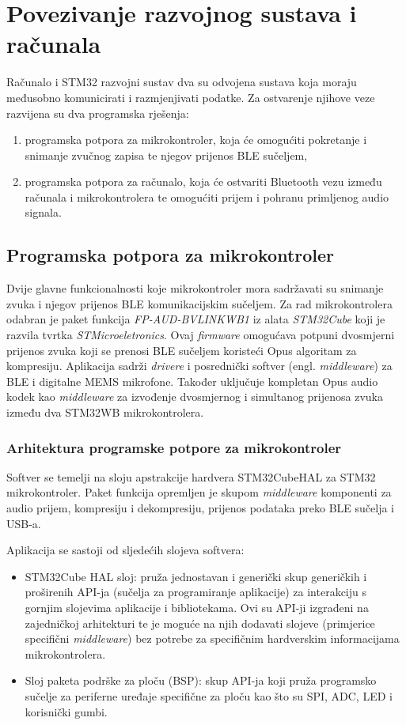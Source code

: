 \chapter{Povezivanje razvojnog sustava i računala}

Računalo i STM32 razvojni sustav dva su odvojena sustava koja moraju međusobno komunicirati i razmjenjivati podatke. Za ostvarenje njihove veze razvijena su dva programska rješenja:
\begin{enumerate}
	\item programska potpora za mikrokontroler, koja će omogućiti pokretanje i snimanje zvučnog zapisa te njegov prijenos BLE sučeljem,
	\item programska potpora za računalo, koja će ostvariti Bluetooth vezu između računala i mikrokontrolera te omogućiti prijem i pohranu primljenog audio signala.
\end{enumerate} 

\section{Programska potpora za mikrokontroler}

Dvije glavne funkcionalnosti koje mikrokontroler mora sadržavati su snimanje zvuka i njegov prijenos BLE komunikacijskim sučeljem. Za rad mikrokontrolera odabran je paket funkcija \textit{FP-AUD-BVLINKWB1} iz alata \textit{STM32Cube} koji je razvila tvrtka \textit{STMicroeletronics}. Ovaj \textit{firmware} omogućava potpuni dvosmjerni prijenos zvuka koji se prenosi BLE sučeljem koristeći Opus algoritam za kompresiju. Aplikacija sadrži \textit{drivere} i posrednički softver (engl. \textit{middleware}) za BLE i digitalne MEMS mikrofone. Također uključuje kompletan Opus audio kodek kao \textit{middleware} za izvođenje dvosmjernog i simultanog prijenosa zvuka između dva STM32WB mikrokontrolera. 

\subsection{Arhitektura programske potpore za mikrokontroler}

Softver se temelji na sloju apstrakcije hardvera STM32CubeHAL za STM32 mikrokontroler. Paket funkcija opremljen je skupom \textit{middleware} komponenti za audio prijem, kompresiju i
dekompresiju, prijenos podataka preko BLE sučelja i USB-a.

Aplikacija se sastoji od sljedećih slojeva softvera:
\begin{itemize}
	\item STM32Cube HAL sloj: pruža jednostavan i generički skup generičkih i proširenih API-ja (sučelja za programiranje aplikacije) za interakciju s gornjim slojevima aplikacije i bibliotekama. Ovi su API-ji izgrađeni na zajedničkoj arhitekturi te je moguće na njih dodavati slojeve (primjerice specifični \textit{middleware}) bez potrebe za specifičnim hardverskim informacijama mikrokontrolera.
	\item Sloj paketa podrške za ploču (BSP): skup API-ja koji pruža programsko sučelje za periferne uređaje specifične za ploču kao što su SPI, ADC, LED i korisnički gumbi.
\end{itemize}

